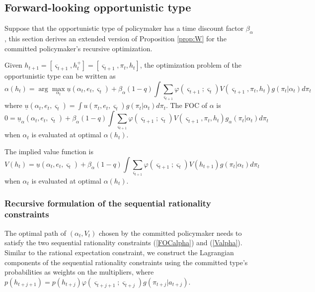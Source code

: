 \documentclass[12pt,letter,leqno]{article}
\theoremstyle{asn}
\theoremstyle{lem}
\theoremstyle{slem}
\theoremstyle{prop}
\theoremstyle{appprop}
\theoremstyle{rem}
\theoremstyle{defn}
\begin{document}
\begin{oldversion}

\subsection{Forward-looking opportunistic type}\label{app:FL}
Suppose that the opportunistic type of policymaker has a time discount factor $\beta_\alpha$, this section derives an extended version of Proposition \ref{prop:W} for the committed policymaker's recursive optimization.

Given $h_{t+1}=[\varsigma _{t+1},h_{t}^{+}]=[\varsigma _{t+1},\pi
_{t},h_{t}] $, the optimization problem of the opportunistic type can be
written as%
\begin{equation*}
\alpha \left( h_{t}\right) =\arg \max_{\alpha _{t}}\underline{u}%
(\alpha _{t},e_{t},\varsigma _{t}) +\beta_{\alpha}(1-q)\int \sum_{\varsigma _{t+1}}\varphi
(\varsigma _{t+1};\varsigma _{t})V\left( \varsigma _{t+1},\pi _{t}, h_{t}\right) g\left( \pi _{t}|\alpha _{t}\right)
d\pi _{t}
\end{equation*}%
where $\underline{u}(\alpha _{t},e_{t},\varsigma _{t})=\int 
{u}(\pi _{t},e_{t},\varsigma _{t})g\left( \pi _{t}|\alpha _{t}\right) d\pi _{t}$. The FOC of $%
\alpha $ is%
\begin{equation}
0=\underline{u}_{\alpha }(\alpha _{t},e_{t},\varsigma _{t})+
\beta_{\alpha}(1-q)\int \sum_{\varsigma _{t+1}}\varphi (\varsigma
_{t+1};\varsigma _{t})V\left( \varsigma _{t+1},\pi _{t},h%
_{t}\right) g_{\alpha }\left( \pi _{t}|\alpha _{t}\right) d\pi
_{t}  \label{FOCalpha}
\end{equation}%
when $\alpha _{t}$ is evaluated at optimal $\alpha \left( h_{t}\right) .$

The implied value function is%
\begin{equation}
V\left( h_{t}\right) =\underline{u}(\alpha _{t},e_{t},\varsigma _{t})+\beta_{\alpha}(1-q)\int \sum_{\varsigma _{t+1}}\varphi
(\varsigma _{t+1};\varsigma _{t})V\left( h_{t+1}\right) g%
\left( \pi _{t}|\alpha _{t}\right) d\pi _{t}  \label{Valpha}
\end{equation}%
when $\alpha _{t}$ is evaluated at optimal $\alpha \left( h_{t}\right) .$

\subsubsection{Recursive formulation of the sequential rationality constraints}
The optimal path of $\left( \alpha _{t},V_{t}\right) $ chosen by the
committed policymaker needs to satisfy the two sequential rationality
constraints (\ref{FOCalpha}) and (\ref{Valpha}). Similar to the rational
expectation constraint, we construct the Lagrangian components of the
sequential rationality constraints using the committed type's probabilities
as weights on the multipliers, where $p(h_{t+j+1})=p\left( h_{t+j}\right)
\varphi (\varsigma _{t+j+1};\varsigma _{t+j})g(\pi _{t+j}|a_{t+j}).$


\end{oldversion}
\end{document}
